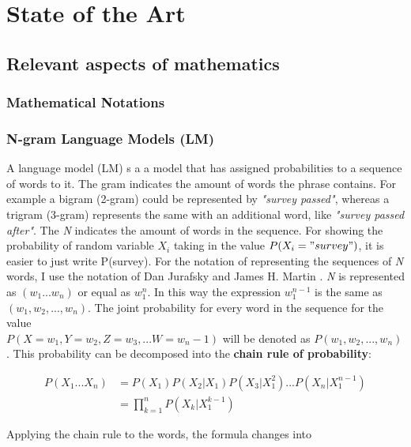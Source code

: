 \chapter{State of the Art}\label{ch:sota}

\section{Relevant aspects of mathematics}

\subsection{Mathematical Notations}

\subsection{N-gram Language Models (LM)}\label{ss:ngram}
A language model (LM) s a a model that has assigned probabilities to a sequence of words to it. The gram indicates the amount of words the phrase contains. For example a bigram (2-gram) could be represented by \textit{"survey passed"}, whereas a trigram (3-gram) represents the same with an additional word, like \textit{"survey passed after"}. The \textit{N} indicates the amount of words in the sequence. For showing the probability of random variable \(X_i\) taking in the value  \(P(X_i = "survey")\), it is easier to just write P(survey). For the notation of representing the sequences of \textit{N} words, I use the notation of Dan Jurafsky and James H. Martin \cite{LM}. \textit{N} is represented as \((w_1 ... w_n)\) or equal as \(w_1^{n}\). In this way the expression \(w_1^{n-1}\) is the same as \((w_1, w_2, ... , w_n)\). The joint probability for every word in the sequence for the value \\
\( P(X = w_1, Y = w_2, Z = w_3, ... W = w_n-1) \) will be denoted as \( P(w_1, w_2, ... , w_n) \). This probability can be decomposed into the \textbf{chain rule of probability}:

% 

\begin{equation}
\begin{split}
P(X_1 ... X_n) & = P(X_1)P(X_2|X_1)P(X_3|X_1^{2})...P(X_n|X_1^{n-1}) \\
& = \prod_{k=1}^{n} P(X_k|X_1^{k-1})
\end{split}
\end{equation}

Applying the chain rule to the words, the formula changes into \cite{LM}

